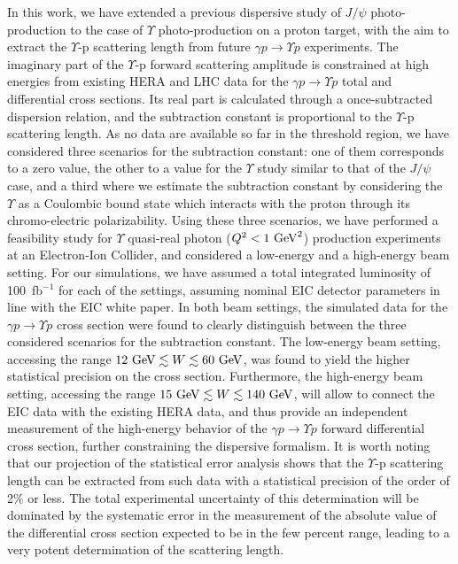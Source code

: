 \documentclass[prd,amsmath,%
twocolumn,floatfix,amssymb, preprintnumbers, linenumbers,nofootinbib, superscriptaddress]{revtex4}
\begin{document}
In this work, we have extended a previous dispersive study of $J/\psi$ photo-production to the case of $\Upsilon$ photo-production on a proton target, with the aim to extract the $\Upsilon$-p scattering length from future $\gamma p \to \Upsilon p$ experiments. The imaginary part of the $\Upsilon$-p forward scattering amplitude is constrained at high energies from existing HERA and LHC data for the $\gamma p \to \Upsilon p$ total and differential cross sections. 
Its real part is calculated through a once-subtracted dispersion relation, and the subtraction constant is proportional to the $\Upsilon$-p scattering length. 
As no data are available so far in the threshold region, we have  considered three scenarios for the subtraction constant: one of them corresponds to a zero value, the other to a value for the $\Upsilon$ study similar to that of the $J/\psi$ case, and a third where we estimate the subtraction constant by considering the $\Upsilon$ as a Coulombic bound state which interacts with the proton through its chromo-electric polarizability. 
Using these three scenarios, we have performed a feasibility study for $\Upsilon$ quasi-real photon ($Q^2 < 1~\rm{GeV}^2$) production experiments at an Electron-Ion Collider, and considered a low-energy and a high-energy beam setting. 
For our simulations, we have assumed a total integrated luminosity of 100~fb$^{-1}$ for each of the settings, assuming nominal EIC detector parameters in line with the EIC white paper.   
In both beam settings, the simulated data for the $\gamma p \to \Upsilon p$ cross section were found to clearly distinguish between the three considered scenarios for the subtraction constant.
The low-energy beam setting, accessing the range $12~{\rm{GeV}}\lesssim W \lesssim 60~{\rm{GeV}}$, was found to yield the higher statistical precision on the cross section. Furthermore, the high-energy beam setting, accessing the range $15~{\rm{GeV}}\lesssim W \lesssim 140~{\rm{GeV}}$, will allow to connect the EIC data with the existing HERA data, and thus provide an independent measurement of the high-energy behavior of the $\gamma p \to \Upsilon p$ forward differential cross section, further constraining the dispersive formalism. It is worth noting that our projection of the statistical error analysis shows that the $\Upsilon$-p scattering length can be extracted from such data with a statistical precision of the order of 2\% or less. The total experimental uncertainty of this determination will be dominated by the systematic error in the measurement of the absolute value of the differential cross section expected to be in the few percent range,  leading to a very potent determination of the scattering length.
\end{document}
